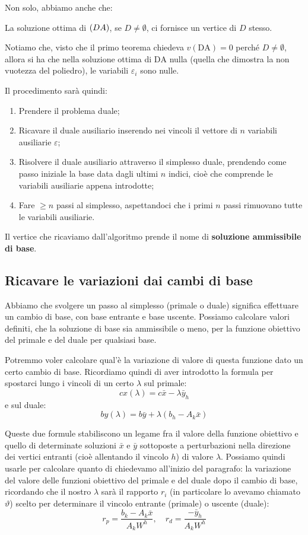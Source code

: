 \documentclass[a4paper,11pt]{article}
\begin{document}
Non solo, abbiamo anche che:
\begin{theorem}{}
	La soluzione ottima di $\text(DA)$, se $D \neq \emptyset$, ci fornisce un vertice di $D$ stesso.
\end{theorem}
Notiamo che, visto che il primo teorema chiedeva $v(\text{DA}) = 0$ perché $D \neq \emptyset$, allora si ha che nella soluzione ottima di $\text{DA}$ nulla (quella che dimostra la non vuotezza del poliedro), le variabili $\varepsilon_i$ sono nulle.

Il procedimento sarà quindi:
\begin{enumerate}
	\item Prendere il problema duale;
	\item Ricavare il duale ausiliario inserendo nei vincoli il vettore di $n$ variabili ausiliarie $\varepsilon$;
	\item Risolvere il duale ausiliario attraverso il simplesso duale, prendendo come passo iniziale la base data dagli ultimi $n$ indici, cioè che comprende le variabili ausiliarie appena introdotte;
	\item Fare $\geq n$ passi al simplesso, aspettandoci che i primi $n$ passi rimuovano tutte le variabili ausiliarie.
\end{enumerate}

Il vertice che ricaviamo dall'algoritmo prende il nome di \textbf{soluzione ammissibile di base}.

\subsection{Ricavare le variazioni dai cambi di base}
Abbiamo che svolgere un passo al simplesso (primale o duale) significa effettuare un cambio di base, con base entrante e base uscente.
Possiamo calcolare valori definiti, che la soluzione di base sia ammissibile o meno, per la funzione obiettivo del primale e del duale per qualsiasi base.

Potremmo voler calcolare qual'è la variazione di valore di questa funzione dato un certo cambio di base.
Ricordiamo quindi di aver introdotto la formula per spostarci lungo i vincoli di un certo $\lambda$ sul primale:
$$
cx(\lambda) = c\bar{x} - \lambda\bar{y}_h
$$
e sul duale:
$$
by(\lambda) = b\bar{y} + \lambda\left( b_h - A_k \bar{x} \right)
$$

Queste due formule stabiliscono un legame fra il valore della funzione obiettivo e quello di determinate soluzioni $\bar{x}$ e $\bar{y}$ sottoposte a perturbazioni nella direzione dei vertici entranti (cioè allentando il vincolo $h$) di valore $\lambda$.
Possiamo quindi usarle per calcolare quanto di chiedevamo all'inizio del paragrafo: la variazione del valore delle funzioni obiettivo del primale e del duale dopo il cambio di base, ricordando che il nostro $\lambda$ sarà il rapporto $r_i$ (in particolare lo avevamo chiamato $\vartheta$) scelto per determinare il vincolo entrante (primale) o uscente (duale):
$$
r_p = \frac{b_k - A_k \bar{x}}{A_k W^h}, \quad r_d = \frac{-\bar{y}_h}{A_k W^h}
$$
\end{document}
